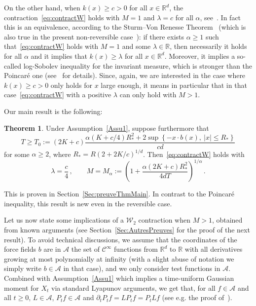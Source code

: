 \documentclass[10pt]{amsart}
\theoremstyle{definition}\newtheorem{defi}[theo]{Definition}\newtheorem{rema}[theo]{Remark}\newtheorem{exam}[theo]{Example}\newtheorem{exem}[theo]{Example}\newtheorem{nota}[theo]{Notation}
\newcommand{\R}{\mathbb R}
\newcommand{\A}{\mathcal A}
\newcommand{\clC}{\mathcal C}
\newcommand{\clW}{\mathcal W}
\newcommand{\1}{\mathbbm{1}}
\newcommand{\nv}[1]{#1}
\newtheorem{thm}[theo]{Theorem}
\begin{document}
On the other hand, when $k(x) \geqslant c >0$ for all $x\in\R^d$, the contraction~\eqref{eq:contractW} holds with $M=1$ and $\lambda=c$ for all $\alpha$, see~\cite{MonmarcheContraction}. In fact this is an equivalence\nv{, according to the Sturm--Von Renesse Theorem~\cite{VonRenesseSturm} (which is also true in the present non-reversible case~\cite{MonmarcheContraction}):} if there exists $\alpha\geqslant 1$ such that~\eqref{eq:contractW} holds with $M=1$ and some $\lambda\in\R$, then necessarily it holds for all $\alpha$ and it implies that $k(x) \geqslant \lambda$ for all $x\in\R^d$. \nv{Moreover, it implies a so-called log-Sobolev inequality for the invariant measure, which is stronger than the Poincaré one (see~\cite{MonmarcheContraction} for details)}. \nv{Since,} again, we are interested in the case where $k(x)\geqslant c>0$ only holds for $x$ large enough, it means in particular that in that case~\eqref{eq:contractW} with a positive $\lambda$ can only hold with $M>1$.


Our main result is the following:

\begin{thm}\label{Thm:main}
Under Assumption~\ref{Assu1}, suppose furthermore that
\begin{equation}\label{eq:conditionT}
T\geqslant T_0:=(2K+c)\frac{ \alpha (K+c/4)R_*^2 +2 \sup\left\{-x\cdot b(x),\ |x|\leqslant R_*\right\}}{cd}
\end{equation}
for some $\alpha \geqslant 2$, where $R_*=R( 2+2K/c)^{1/d}$. Then~\eqref{eq:contractW} holds with
\[
\lambda = \frac c4 \,, \qquad M= M_\alpha := \left( 1+ \frac{\alpha (2K+c)R_*^2}{4dT}\right)^{1/\alpha}\,.
\]
\end{thm}


This is proven in Section~\ref{Sec:preuveThmMain}. In contrast to the Poincaré inequality, this result is new even in the reversible case.


Let us now state some implications of a $\clW_2$ contraction when $M>1$, obtained from known arguments (see Section~\ref{Sec:AutresPreuves} for the proof of the next result). To avoid technical discussions, we assume that the coordinates of the force fields $b$ are in $\A$ the set of $\clC^\infty$ functions from $\R^d$ to $\R$ with all derivatives growing at most polynomially at infinity (with a slight abuse of notation we simply write $b\in\A$ in that case), and we only consider test functions in $\A$. Combined with Assumption~\ref{Assu1} which implies a time-uniform Gaussian moment for $X_t$ via standard Lyapunov arguments, we get that, for all $f\in\A$ and all $t\geqslant 0$, $L\in\A$, $P_t f\in \A$ and $\partial_t P_t f = LP_t f = P_t Lf$ (see e.g. the proof of~\cite[Theorem~2.5]{EthierKurtz}).
\end{document}
